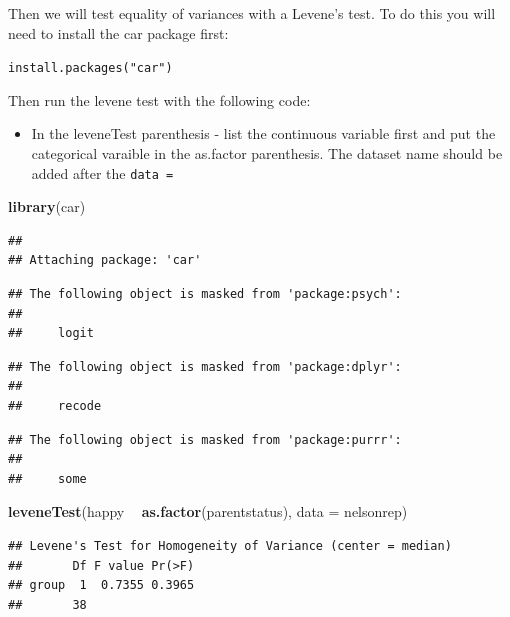 \documentclass[
]{book}
\newenvironment{Shaded}{\begin{snugshade}}{\end{snugshade}}
\newcommand{\DataTypeTok}[1]{\textcolor[rgb]{0.13,0.29,0.53}{#1}}
\newcommand{\KeywordTok}[1]{\textcolor[rgb]{0.13,0.29,0.53}{\textbf{#1}}}
\newcommand{\NormalTok}[1]{#1}
\newcommand{\OperatorTok}[1]{\textcolor[rgb]{0.81,0.36,0.00}{\textbf{#1}}}
\newcommand{\StringTok}[1]{\textcolor[rgb]{0.31,0.60,0.02}{#1}}
\providecommand{\tightlist}{%
  \setlength{\itemsep}{0pt}\setlength{\parskip}{0pt}}
\begin{document}
Then we will test equality of variances with a Levene's test. To do this you will need to install the car package first:

\texttt{install.packages("car")}

Then run the levene test with the following code:

\begin{itemize}
\tightlist
\item
  In the leveneTest parenthesis - list the continuous variable first and put the categorical varaible in the as.factor parenthesis. The dataset name should be added after the \texttt{data\ =}
\end{itemize}

\begin{Shaded}
\begin{Highlighting}[]
\KeywordTok{library}\NormalTok{(car) }
\end{Highlighting}
\end{Shaded}

\begin{verbatim}
## 
## Attaching package: 'car'
\end{verbatim}

\begin{verbatim}
## The following object is masked from 'package:psych':
## 
##     logit
\end{verbatim}

\begin{verbatim}
## The following object is masked from 'package:dplyr':
## 
##     recode
\end{verbatim}

\begin{verbatim}
## The following object is masked from 'package:purrr':
## 
##     some
\end{verbatim}

\begin{Shaded}
\begin{Highlighting}[]
\KeywordTok{leveneTest}\NormalTok{(happy }\OperatorTok{~}\StringTok{ }\KeywordTok{as.factor}\NormalTok{(parentstatus), }\DataTypeTok{data =}\NormalTok{ nelsonrep)}
\end{Highlighting}
\end{Shaded}

\begin{verbatim}
## Levene's Test for Homogeneity of Variance (center = median)
##       Df F value Pr(>F)
## group  1  0.7355 0.3965
##       38
\end{verbatim}
\end{document}
